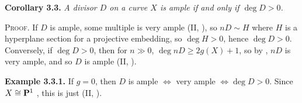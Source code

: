 {\medskip
\noindent\hypertarget{result-IV-3.3}{}\textbf{Corollary 3.3.} \emph{A divisor $D$ on a curve $X$ is ample if and only if $\deg D>0$.}

\smallskip
\noindent\textsc{Proof.} If $D$ is ample, some multiple is very ample (II, ), so $nD\sim H$ where $H$ is a hyperplane section for a projective embedding, so $\deg H>0$, hence $\deg D>0$. Conversely, if $\deg D>0$, then for $n\gg0$, $\deg nD\geq2g(X)+1$, so by , $nD$ is very ample, and so $D$ is ample (II, ).

\medskip
\noindent\hypertarget{result-IV-3.3.1}{}\textbf{Example 3.3.1.} If $g=0$, then $D$ is ample $\Leftrightarrow$ very ample $\Leftrightarrow\deg D>0$. Since $X\cong\mathbf{P}^1$ , this is just (II, ).
}
